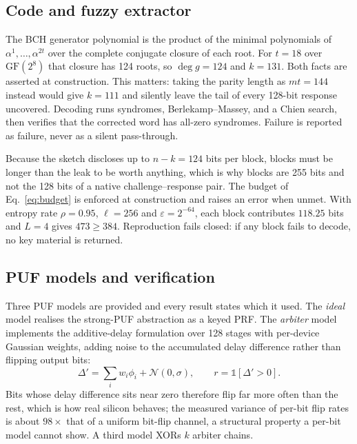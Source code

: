 \documentclass[conference]{IEEEtran}
\begin{document}
\subsection{Code and fuzzy extractor}

The BCH generator polynomial is the product of the minimal polynomials of
$\alpha^1,\dots,\alpha^{2t}$ over the complete conjugate closure of each root.
For $t=18$ over $\mathrm{GF}(2^8)$ that closure has 124 roots, so $\deg g = 124$
and $k = 131$. Both facts are asserted at construction. This matters: taking the
parity length as $mt = 144$ instead would give $k = 111$ and silently leave the
tail of every 128-bit response uncovered. Decoding runs syndromes,
Berlekamp--Massey, and a Chien search, then verifies that the corrected word has
all-zero syndromes. Failure is reported as failure, never as a silent pass-through.

Because the sketch discloses up to $n-k = 124$ bits per block, blocks must be
longer than the leak to be worth anything, which is why blocks are 255 bits and
not the 128 bits of a native challenge--response pair. The budget of
Eq.~\eqref{eq:budget} is enforced at construction and raises an error when
unmet. With entropy rate $\rho = 0.95$, $\ell = 256$ and $\varepsilon = 2^{-64}$,
each block contributes $118.25$ bits and $L=4$ gives $473 \ge 384$. Reproduction
fails closed: if any block fails to decode, no key material is returned.

\subsection{PUF models and verification}

Three PUF models are provided and every result states which it used. The
\emph{ideal} model realises the strong-PUF abstraction as a keyed PRF. The
\emph{arbiter} model implements the additive-delay formulation over 128 stages
with per-device Gaussian weights, adding noise to the accumulated delay
difference rather than flipping output bits:
\begin{equation}
\Delta' = \textstyle\sum_i w_i \phi_i + \mathcal{N}(0,\sigma), \qquad r = \mathbb{1}[\Delta' > 0].
\end{equation}
Bits whose delay difference sits near zero therefore flip far more often than
the rest, which is how real silicon behaves; the measured variance of per-bit
flip rates is about $98\times$ that of a uniform bit-flip channel, a structural
property a per-bit model cannot show. A third model XORs $k$ arbiter chains.
\end{document}
